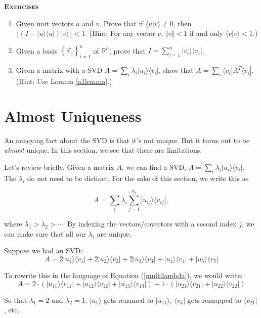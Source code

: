 \documentclass{amsbook}
\begin{document}
{\bfseries\scshape\Large Exercises}

\begin{enumerate}
\item \label{finish_projection} Given unit vectors $u$ and $v$.  Prove that if $\langle u|v\rangle\neq0$, then $\left\Vert\left(I-|u\rangle\langle u|\right)|v\rangle\right\Vert < 1$.  (Hint:  For any vector $ v $, $\Vert  v \Vert<1$ if and only $\langle  v | v \rangle<1$.)
\item \label{outer_product_identity} Given a basis $\left\{\vec v_i\right\}_{i=1}^n$ of $\mathbb R^n$, prove that $I=\sum_{i=1}^n|v_i\rangle\langle v_i|$.
\item Given a matrix with a SVD $A=\sum_i\lambda_i|u_i\rangle\langle v_i|$, show that $A=\sum_i\langle v_i| A^T\langle v_i|$.  (Hint: Use Lemma \ref{a1lemma}.)
\end{enumerate}

\section{Almost Uniqueness}\label{almost_uniqueness}

An annoying fact about the SVD is that it's not unique.  But it turns out to be {\em almost} unique.  In this section, we see that there are limitations.

Let's review briefly.  Given a matrix $A$, we can find a SVD, $A=\sum_i\lambda_i|u_i\rangle\langle v_i|$.  The $\lambda_i$ do not need to be distinct.  For the sake of this section, we write this as 

\begin{equation}
\label{multilambda}
A=\sum_i\lambda_i\sum_{j=1}^{n_i}|u_{ij}\rangle\langle v_{ij}|,
\end{equation}

 where $\lambda_1>\lambda_2>\cdots$.  By indexing the vectors/covectors with a second index $j$, we can make sure that all our $\lambda_i$ are unique.
 
\begin{tcolorbox}[title=Example,colback=blue!5]
Suppose we had an SVD:
$$
A=2|u_1\rangle\langle v_1|+2|u_2\rangle\langle v_2|+2|u_3\rangle\langle v_3|+|u_4\rangle\langle v_4|+|u_5\rangle\langle v_5|
$$

To rewrite this in the language of Equation (\ref{multilambda}), we would write:
$$
A=2\cdot\left(|u_{11}\rangle\langle v_{11}|+|u_{12}\rangle\langle v_{12}|+|u_{13}\rangle\langle v_{13}|\right)+1\cdot\left(|u_{21}\rangle\langle v_{21}|+|u_{22}\rangle\langle v_{22}|\right)
$$

So that $\lambda_1=2$ and $\lambda_2=1$.  $|u_1\rangle$ gets renamed to $|u_{11}\rangle$, $\langle v_4|$ gets remapped to $\langle v_{21}|$, etc.

\end{tcolorbox}
\end{document}
